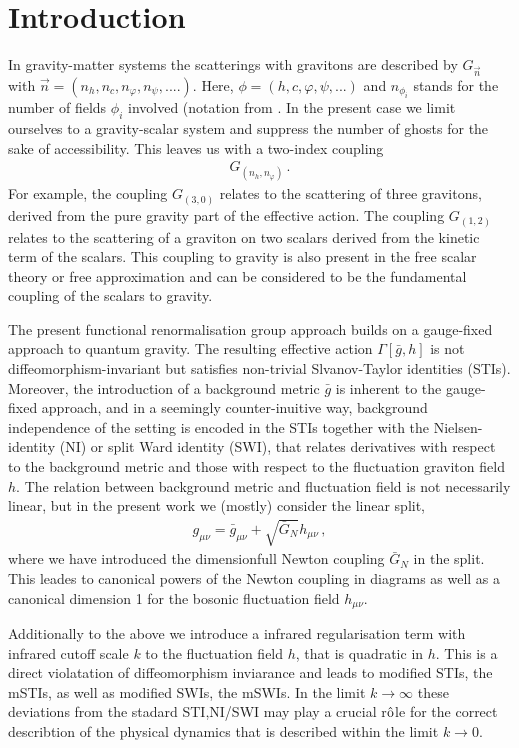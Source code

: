 \documentclass[11pt]{book} %
\begin{document}
\section{Introduction}
In gravity-matter systems the scatterings with gravitons are described
by $G_{\vec n}$ with $\vec n=(n_h, n_c,n_\varphi,n_\psi,....)$. Here,
$\phi=(h,c,\varphi,\psi,...)$ and $n_{\phi_i}$ stands for the number
of fields $\phi_i$ involved (notation from \cite{Meibohm:2016mkp} . In
the present case we limit ourselves to a gravity-scalar system and
suppress the number of ghosts for the sake of accessibility. This
leaves us with a two-index coupling
\begin{align}
G_{(n_h,n_\varphi)}\,.
\end{align}
For example, the coupling $G_{(3, 0)}$ relates to the scattering of
three gravitons, derived from the pure gravity part of the effective
action. The coupling $G_{(1,2)}$ relates to the scattering of a
graviton on two scalars derived from the kinetic term of the
scalars. This coupling to gravity is also present in the free scalar
theory or free approximation and can be considered to be the
fundamental coupling of the scalars to gravity.

The present functional renormalisation group approach builds on a
gauge-fixed approach to quantum gravity. The resulting effective
action $\Gamma[\bar g,h]$ is not diffeomorphism-invariant but
satisfies non-trivial Slvanov-Taylor identities (STIs). Moreover, the
introduction of a background metric $\bar g$ is inherent to the
gauge-fixed approach, and in a seemingly counter-inuitive way,
background independence of the setting is encoded in the STIs together
with the Nielsen-identity (NI) or split Ward identity (SWI), that
relates derivatives with respect to the background metric and those
with respect to the fluctuation graviton field $h$. The relation
between background metric and fluctuation field is not necessarily
linear, but in the present work we (mostly) consider the linear split,
\begin{align}\label{eq:linpara}
  g_{\mu \nu}=\bar g_{\mu \nu}+ \sqrt{\bar{G}_N} h_{\mu \nu}\,,
\end{align}
where we have introduced the dimensionfull Newton coupling $\bar{G}_N$ in the split. This
leades to canonical powers of the Newton coupling in diagrams as well
as a canonical dimension 1 for the bosonic fluctuation field $h_{\mu \nu}$.

Additionally to the above we introduce a infrared regularisation term
with infrared cutoff scale $k$ to the fluctuation field $h$, that is
quadratic in $h$. This is a direct violatation of diffeomorphism
inviarance and leads to modified STIs, the mSTIs, as well as modified
SWIs, the mSWIs. In the limit $k\to\infty$ these deviations from the
stadard STI,NI/SWI may play a crucial r$\hat{\rm o}$le for the correct
describtion of the physical dynamics that is described within the
limit $k\to 0$.
\end{document}
